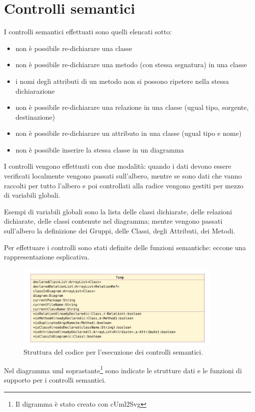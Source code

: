 \section{Controlli semantici}

I controlli semantici effettuati sono quelli elencati sotto:
\begin{itemize}
   \item non è possibile re-dichiarare una classe
   \item non è possibile re-dichiarare una metodo (con stessa segnatura) in una
   classe
   \item i nomi degli attributi di un metodo non si possono ripetere nella stessa dichiarazione
   \item non è possibile re-dichiarare una relazione in una classe (ugual tipo,
   sorgente, destinazione)
   \item non è possibile re-dichiarare un attributo in una classe (ugual tipo e
   nome)
   \item non è possibile inserire la stessa classe in un diagramma 
\end{itemize}

I controlli vengono effettuati con due modalità: quando i dati devono essere
verificati localmente vengono passati sull'albero, mentre se sono dati che vanno
raccolti per tutto l'albero e poi controllati alla radice vengono gestiti per
mezzo di variabili globali.

Esempi di variabili globali sono la lista delle classi dichiarate, delle
relazioni dichiarate, delle classi contenute nel diagramma; mentre vengono passati
sull'albero la
definizione dei Gruppi, delle Classi, degli Attributi, dei Metodi.

Per effettuare i controlli sono stati definite delle funzioni semantiche: eccone
una rappresentazione esplicativa.

\begin{figure}[htp]
\begin{center}
  \includegraphics[width=0.9\textwidth]{img/uml_compilatore.png}
  \caption[labelInTOC]{Struttura del codice per l'esecuzione dei controlli semantici.}
\end{center}
\end{figure}

Nel diagramma uml soprastante\footnote{Il digramma è stato creato con cUml2Svg} sono
indicate le strutture dati e le funzioni di supporto per i controlli semantici.
